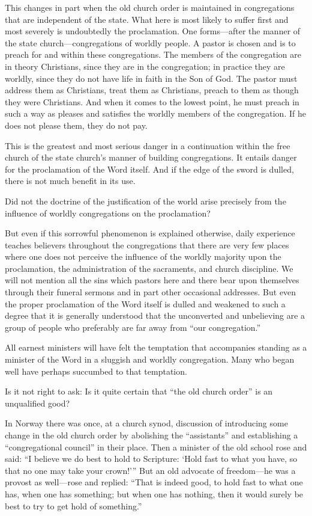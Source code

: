 This changes in part when the old church order is maintained in congregations that are independent of the state. What here is most likely to suffer first and most severely is undoubtedly the proclamation. One forms—after the manner of the state church—congregations of worldly people. A pastor is chosen and is to preach for and within these congregations. The members of the congregation are in theory Christians, since they are in the congregation; in practice they are worldly, since they do not have life in faith in the Son of God. The pastor must address them as Christians, treat them as Christians, preach to them as though they were Christians. And when it comes to the lowest point, he must preach in such a way as pleases and satisfies the worldly members of the congregation. If he does not please them, they do not pay.

This is the greatest and most serious danger in a continuation within the free church of the state church’s manner of building congregations. It entails danger for the proclamation of the Word itself. And if the edge of the sword is dulled, there is not much benefit in its use.

Did not the doctrine of the justification of the world arise precisely from the influence of worldly congregations on the proclamation?

But even if this sorrowful phenomenon is explained otherwise, daily experience teaches believers throughout the congregations that there are very few places where one does not perceive the influence of the worldly majority upon the proclamation, the administration of the sacraments, and church discipline. We will not mention all the sins which pastors here and there bear upon themselves through their funeral sermons and in part other occasional addresses. But even the proper proclamation of the Word itself is dulled and weakened to such a degree that it is generally understood that the unconverted and unbelieving are a group of people who preferably are far away from “our congregation.”

All earnest ministers will have felt the temptation that accompanies standing as a minister of the Word in a sluggish and worldly congregation. Many who began well have perhaps succumbed to that temptation.

Is it not right to ask: Is it quite certain that “the old church order” is an unqualified good?

In Norway there was once, at a church synod, discussion of introducing some change in the old church order by abolishing the “assistants” and establishing a “congregational council” in their place. Then a minister of the old school rose and said: “I believe we do best to hold to Scripture: ‘Hold fast to what you have, so that no one may take your crown!’” But an old advocate of freedom—he was a provost as well—rose and replied: “That is indeed good, to hold fast to what one has, when one has something; but when one has nothing, then it would surely be best to try to get hold of something.”

